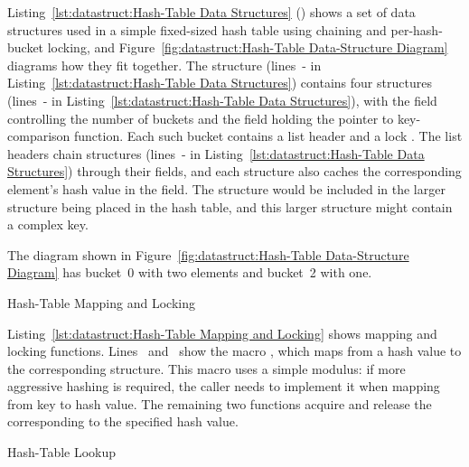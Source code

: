 \begin{lineref}
Listing~\ref{lst:datastruct:Hash-Table Data Structures}
()
shows a set of data structures used in a simple fixed-sized hash
table using chaining and per-hash-bucket locking, and
Figure~\ref{fig:datastruct:Hash-Table Data-Structure Diagram}
diagrams how they fit together.
The  structure (lines~- in
Listing~\ref{lst:datastruct:Hash-Table Data Structures})
contains four  structures
(lines~- in
Listing~\ref{lst:datastruct:Hash-Table Data Structures}),
with the  field controlling the number of buckets
and the  field holding the pointer to key-comparison
function.
Each such bucket contains a list header  and
a lock .
The list headers chain  structures
(lines~- in
Listing~\ref{lst:datastruct:Hash-Table Data Structures})
through their
 fields, and each  structure also caches
the corresponding element's hash value in the  field.
The  structure would be included in the larger structure
being placed in the hash table, and this larger structure might contain
a complex key.
\end{lineref}

The diagram shown in
Figure~\ref{fig:datastruct:Hash-Table Data-Structure Diagram}
has bucket~0 with two elements and bucket~2 with one.

\begin{listing}[tb]

\caption{Hash-Table Mapping and Locking}
\label{lst:datastruct:Hash-Table Mapping and Locking}
\end{listing}

\begin{lineref}
Listing~\ref{lst:datastruct:Hash-Table Mapping and Locking}
shows mapping and locking functions.
Lines~ and~
show the macro , which maps from a hash value
to the corresponding  structure.
This macro uses a simple modulus: if more aggressive hashing is required,
the caller needs to implement it when mapping from key to hash value.
The remaining two functions acquire and release the 
corresponding to the specified hash value.
\end{lineref}

\begin{listing}[tb]

\caption{Hash-Table Lookup}
\label{lst:datastruct:Hash-Table Lookup}
\end{listing}

